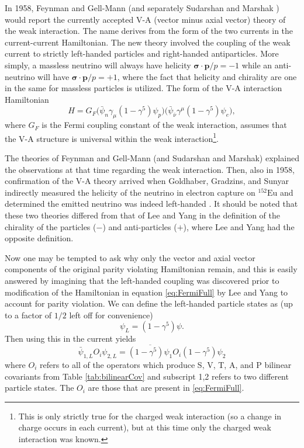 In 1958, Feynman and Gell-Mann \cite{feynman1958} (and separately Sudarshan and Marshak
\cite{sudarshan1958}) would report the currently accepted V-A (vector minus axial vector)
theory of the weak interaction. The name derives from the form of the two currents in the
current-current Hamiltonian.
The new theory involved the coupling of the weak current to strictly left-handed particles and right-handed
antiparticles. More simply, a massless neutrino will always have helicity
$\boldsymbol{\sigma \cdot p}/p = -1$ while an anti-neutrino will have $\boldsymbol{\sigma \cdot p}/p = +1$,
where the fact that helicity and chirality are one in the same for massless particles is utilized.
The form of the V-A interaction Hamiltonian
%
\begin{equation}
  H = G_F \Big(\bar{\psi}_n \gamma_\mu(1-\gamma^5)\psi_p \Big)\Big(\bar{\psi}_{\bar{\nu}} \gamma^\mu(1-\gamma^5)\psi_e \Big),
  \label{eq:VminusA}
\end{equation}
%
where $G_F$ is the Fermi coupling constant of the weak interaction,
assumes that the V-A structure is universal within the weak interaction\footnote{This is
  only strictly true for the charged weak interaction (so a change in charge occurs in each current),
  but at this time only the charged weak interaction
  was known.}.

The theories of Feynman and Gell-Mann (and Sudarshan and Marshak)
explained the observations at that time
regarding the weak interaction. Then, also in 1958, confirmation of the V-A theory arrived when
Goldhaber, Gradzins, and Sunyar indirectly measured
the helicity of the neutrino in electron capture on $^{152}\mathrm{Eu}$ and determined the
emitted neutrino was indeed left-handed
\cite{goldhaber1958,greiner1996}. It should be noted that these two theories differed from that of
Lee and Yang in the definition of the chirality of the particles ($-$) and anti-particles ($+$), where
Lee and Yang had the opposite definition.

Now one may be tempted to ask why only the vector and axial vector components of the original
parity violating Hamiltonian remain, and this is easily answered by imagining that the
left-handed coupling was discovered prior to modification of the Hamiltonian in equation
\ref{eq:FermiFull} by Lee and Yang to account for parity violation. We can define the left-handed
particle states as (up to a factor of $1/2$ left off for convenience)
%
\begin{equation}
  \psi_L = (1-\gamma^5)\psi.
\end{equation}
%
Then using this in the current yields
%
\begin{equation}
  \bar{\psi}_{1,L} O_i \psi_{2,L} = \overline{(1-\gamma^5)\psi_{1}} O_i (1-\gamma^5)\psi_{2}
\end{equation}
%
where $O_i$ refers to all of the operators which produce S, V, T, A, and P bilinear covariants
from Table \ref{tab:bilinearCov} and subscript 1,2 refers to two different particle states.
The $O_i$ are those that are present in \ref{eq:FermiFull}.


